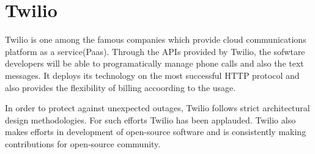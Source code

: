\section{Twilio}

Twilio is one among the famous companies which provide cloud communications
platform as a service(Paas). Through the APIs provided by Twilio, the sofwtare
developers will be able to programatically manage phone calls and also the text
messages. It deploys its technology on the most successful HTTP protocol and
also provides the flexibility of billing accoording to the usage.

In order to protect against unexpected outages, Twilio follows strict
architectural design methodologies. For such efforts Twilio has been applauded.
Twilio also makes efforts in development of open-source software and is
consistently making contributions for open-source community. \cite{Twilio}




